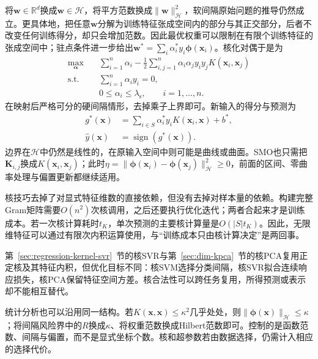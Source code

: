 将$\bm{w}\in\mathbb{R}^d$换成$\bm{w}\in\mathcal{H}$，将平方范数换成$\lVert\bm{w}\rVert_{\mathcal{H}}^2$，软间隔原始问题的推导仍然成立。更具体地，把任意$\bm{w}$分解为训练特征张成空间内的部分与其正交部分，后者不改变任何训练得分，却只会增加范数。因此最优权重可以限制在有限个训练特征的张成空间中；驻点条件进一步给出$\bm{w}^{\ast}=\sum_i\alpha_i^{\ast}y_i\bm{\phi}(\bm{x}_i)$。核化对偶于是为
\begin{equation}
  \begin{aligned}
    \max_{\bm{\alpha}}\quad&
      \sum_{i=1}^n\alpha_i
       -\frac12\sum_{i,j=1}^n
          \alpha_i\alpha_j y_i y_j
          K(\bm{x}_i,\bm{x}_j)\\
    \text{s.t.}\quad&
      \sum_{i=1}^n\alpha_i y_i=0,\\
    &0\le\alpha_i\le\lambda_{\mathrm{s}},
      \qquad i=1,\ldots,n.
  \end{aligned}
  \label{eq:classification-svm-kernel-dual}
\end{equation}
在映射后严格可分的硬间隔情形，去掉乘子上界即可。新输入的得分与预测为
\begin{equation}
  \begin{aligned}
    g^{\ast}(\bm{x})
      &=\sum_{i\in S}\alpha_i^{\ast}y_i
         K(\bm{x}_i,\bm{x})+b^{\ast},\\
    \hat y(\bm{x})&=\operatorname{sign}(g^{\ast}(\bm{x})).
  \end{aligned}
  \label{eq:classification-svm-kernel-prediction}
\end{equation}
边界在$\mathcal{H}$中仍然是线性的，在原输入空间中则可能是曲线或曲面。SMO也只需把$\bm{K}_{i,j}$换成$K(\bm{x}_i,\bm{x}_j)$；此时$\eta=\lVert\bm{\phi}(\bm{x}_i)-\bm{\phi}(\bm{x}_j)\rVert_{\mathcal{H}}^2\ge0$，前面的区间、零曲率处理与偏置更新都继续适用。

核技巧去掉了对显式特征维数的直接依赖，但没有去掉对样本量的依赖。构建完整Gram矩阵需要$O(n^2)$次核调用，之后还要执行优化迭代；两者合起来才是训练成本。若一次核计算耗时$t_K$，单次预测的主要核计算量是$O(|S|t_K)$。因此，无限维特征可以通过有限次内积运算使用，与“训练成本只由核计算决定”是两回事。

第~\ref{sec:regression-kernel-svr}~节的核SVR与第~\ref{sec:dim-kpca}~节的核PCA复用正定核及其特征内积，但优化目标不同：核SVM选择分类间隔，核SVR拟合连续响应损失，核PCA保留特征空间方差。核合法性可以跨任务复用，所得预测或表示却不能相互替代。

统计分析也可以沿用同一结构。若$K(\bm{x},\bm{x})\le\kappa^2$几乎处处，则$\lVert\bm{\phi}(\bm{x})\rVert_{\mathcal{H}}\le\kappa$；将间隔风险界中的$R$换成$\kappa$、将权重范数换成Hilbert范数即可。控制的是函数范数、间隔与偏置，而不是显式坐标个数。核和超参数若由数据选择，仍需计入相应的选择代价。

